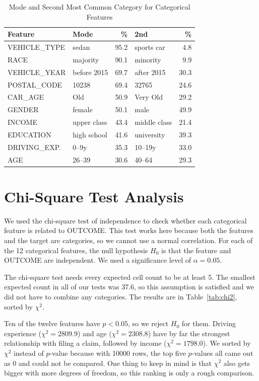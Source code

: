 \documentclass[conference]{IEEEtran}
\begin{document}
\begin{table}[t]
\caption{Mode and Second Most Common Category for Categorical Features}
\label{tab:categorical}
\centering
\setlength{\tabcolsep}{3pt}
\begin{tabular}{@{}llrlr@{}}
\toprule
\textbf{Feature} & \textbf{Mode} & \textbf{\%} & \textbf{2nd} & \textbf{\%} \\
\midrule
VEHICLE\_TYPE  & sedan       & 95.2 & sports car   & 4.8 \\
RACE           & majority    & 90.1 & minority     & 9.9 \\
VEHICLE\_YEAR  & before 2015 & 69.7 & after 2015   & 30.3 \\
POSTAL\_CODE   & 10238       & 69.4 & 32765        & 24.6 \\
CAR\_AGE       & Old         & 50.9 & Very Old     & 29.2 \\
GENDER         & female      & 50.1 & male         & 49.9 \\
INCOME         & upper class & 43.4 & middle class & 21.4 \\
EDUCATION      & high school & 41.6 & university   & 39.3 \\
DRIVING\_EXP.  & 0--9y       & 35.3 & 10--19y      & 33.0 \\
AGE            & 26--39      & 30.6 & 40--64       & 29.3 \\
\bottomrule
\end{tabular}
\end{table}

\section{Chi-Square Test Analysis}
We used the chi-square test of independence to check whether each categorical feature is related to OUTCOME. 
This test works here because both the features and the target are categories, so we cannot use a normal correlation. 
For each of the 12 categorical features, the null hypothesis $H_0$ is that the feature and OUTCOME are 
independent. We used a significance level of $\alpha = 0.05$.
 
The chi-square test needs every expected cell count to be at least 5. The smallest expected count in all of our tests 
was 37.6, so this assumption is satisfied and we did not have to combine any categories. The results are in 
Table~\ref{tab:chi2}, sorted by $\chi^2$.

Ten of the twelve features have $p < 0.05$, so we reject $H_0$ for them. Driving experience ($\chi^2 = 2809.9$) and age 
($\chi^2 = 2308.8$) have by far the strongest relationship with filing a claim, followed by income ($\chi^2 = 1798.0$). 
We sorted by $\chi^2$ instead of $p$-value because with \num{10000} rows, the top five $p$-values all came out as 0 and 
could not be compared. One thing to keep in mind is that $\chi^2$ also gets bigger with more degrees of freedom, so this 
ranking is only a rough comparison.
\end{document}
